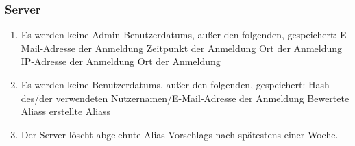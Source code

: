 \subsubsection{Server}

\begin{enumerate}
    \item Es werden keine \Gls{Admin}-\Glspl{Benutzerdatum}, außer den folgenden, gespeichert:
        \subitem E-Mail-Adresse der Anmeldung
        \subitem Zeitpunkt der Anmeldung
        \subitem Ort der Anmeldung
        \subitem \Gls{IP-Adresse} der Anmeldung
        \subitem Ort der Anmeldung
    \item Es werden keine \Glspl{Benutzerdatum}, außer den folgenden, gespeichert:
        \subitem \Gls{Hash} des/der verwendeten Nutzernamen/E-Mail-Adresse der Anmeldung
        \subitem Bewertete \Glspl{Alias} 
        \subitem erstellte \Glspl{Alias} 
    \item Der \Gls{Server} löscht abgelehnte \Glspl{Alias-Vorschlag} nach spätestens einer Woche.
\end{enumerate}